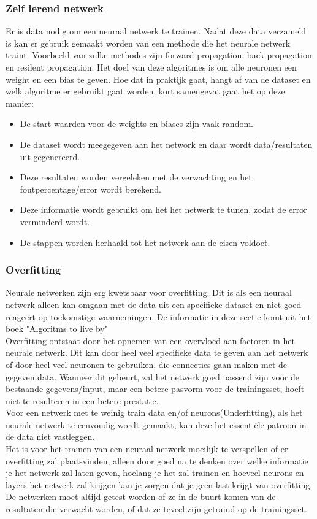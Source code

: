 \subsubsection{Zelf lerend netwerk}
Er is data nodig om een neuraal netwerk te trainen. Nadat deze data verzameld is kan er gebruik gemaakt worden van een methode die het neurale netwerk traint. Voorbeeld van zulke methodes zijn forward propagation, back propagation en resilent propagation. Het doel van deze algoritmes is om alle neuronen een weight en een bias te geven. Hoe dat in praktijk gaat, hangt af van de dataset en welk algoritme er gebruikt gaat worden, kort samengevat gaat het op deze manier\cite{learning}:
\begin{itemize}
\item De start waarden voor de weights en biases zijn vaak random.
\item De dataset wordt meegegeven aan het network en daar wordt data/resultaten uit gegenereerd.
\item Deze resultaten worden vergeleken met de verwachting en het foutpercentage/error wordt berekend.
\item Deze informatie wordt gebruikt om het het netwerk te tunen, zodat de error verminderd wordt.
\item De stappen worden herhaald tot het netwerk aan de eisen voldoet.
\end{itemize}

\subsubsection{Overfitting}
Neurale netwerken zijn erg kwetsbaar voor overfitting. Dit is als een neuraal netwerk alleen kan omgaan met de data uit een specifieke dataset en niet goed reageert op toekomstige waarnemingen. De informatie in deze sectie komt uit het boek "Algoritms to live by" \cite{algoritms}\\
\newline
Overfitting ontstaat door het opnemen van een overvloed aan factoren in het neurale netwerk. Dit kan door heel veel specifieke data te geven aan het netwerk of door heel veel neuronen te gebruiken, die connecties gaan maken met de gegeven data. Wanneer dit gebeurt, zal het netwerk goed passend zijn voor de bestaande gegevens/input, maar een betere pasvorm voor de trainingsset, hoeft niet te resulteren in een betere prestatie. \\
\newline
Voor een netwerk met te weinig train data en/of neurons(Underfitting), als het neurale netwerk te eenvoudig wordt gemaakt, kan deze het essenti\"ele patroon in de data niet vastleggen.\\
\newline
Het is voor het trainen van een neuraal netwerk moeilijk te verspellen of er overfitting zal plaatsvinden, alleen door goed na te denken over welke informatie je het netwerk zal laten geven, hoelang je het zal trainen en hoeveel neurons en layers het netwerk zal krijgen kan je zorgen dat je geen last krijgt van overfitting. De netwerken moet altijd getest worden of ze in de buurt komen van de resultaten die verwacht worden, of dat ze teveel zijn getraind op de trainingsset.